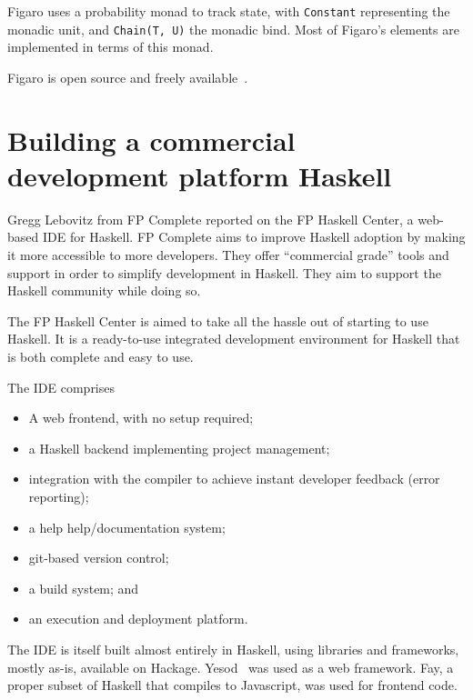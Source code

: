 \documentclass{jfp1}
\begin{document}
Figaro uses a probability monad to track state, with \texttt{Constant}
representing the monadic unit, and \texttt{Chain(T, U)} the monadic
bind. Most of Figaro's elements are implemented in terms of this monad.

Figaro is open source and freely available~\cite{CRA:2014:Figaro}.

\section{Building a commercial development platform Haskell}


Gregg Lebovitz from FP Complete reported on the FP Haskell Center, 
a web-based IDE for Haskell.  FP Complete aims to improve Haskell
adoption by making it more accessible to more developers. They offer
``commercial grade'' tools and support in order to simplify development
in Haskell. They aim to support the Haskell community while doing so.

The FP Haskell Center is aimed to take all the hassle out of starting to
use Haskell. It is a ready-to-use integrated development environment
for Haskell that is both complete and easy to use.

The IDE comprises

\begin{itemize}

\item A web frontend, with no setup required;

\item a Haskell backend implementing project management;

\item integration with the compiler to achieve instant developer
feedback (error reporting); 

\item a help help/documentation system;

\item git-based version control;

\item a build system; and

\item an execution and deployment platform.

\end{itemize}

The IDE is itself built almost entirely in Haskell, using libraries
and frameworks, mostly as-is, available on Hackage.
Yesod~\cite{Snoyman:2012:Developing} was used as a web framework.
Fay, a proper subset of Haskell that compiles to Javascript,
was used for frontend code.
\end{document}
